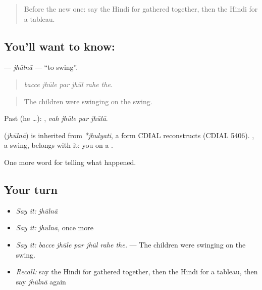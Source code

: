 \begin{quote}
Before the new one: say the Hindi for gathered together, then the Hindi for a tableau.
\end{quote}

\subsection*{You'll want to know: }
\textbf{} — \emph{jhūlnā} — \textquotedblleft{}to swing\textquotedblright{}.

\begin{quote}
     
\end{quote}

\begin{quote}
\emph{bacce jhūle par jhūl rahe the.}
\end{quote}

\begin{quote}
The children were swinging on the swing.
\end{quote}

Past (he …):    , \emph{vah jhūle par jhūlā}.

\begin{cousinweb}
\textbf{} (\emph{jhūlnā}) is inherited from \emph{*jhulyati}, a form CDIAL reconstructs (CDIAL 5406). \textbf{}, a swing, belongs with it: you \textbf{ } on a \textbf{}.
\end{cousinweb}

\begin{grammarlens}[title={What you've built}]
One more word for telling what happened.
\end{grammarlens}

\subsection*{Your turn}
\begin{itemize}
\raggedright
  \item \emph{Say it:} \emph{jhūlnā}
  \item \emph{Say it:} \emph{jhūlnā}, once more
  \item \emph{Say it:} \emph{bacce jhūle par jhūl rahe the.} — The children were swinging on the swing.
  \item \emph{Recall:} say the Hindi for gathered together, then the Hindi for a tableau, then say \emph{jhūlnā} again
\end{itemize}

